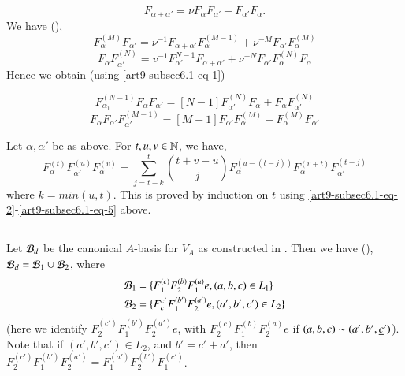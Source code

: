\setcounter{equation}{0}
\begin{equation}\label{art9-subsec6.1-eq-1}
F_{\alpha + \alpha'} = \nu F_{\alpha}F_{\alpha'}-F_{\alpha'}F_{\alpha}.
\end{equation}
We have (\cite{art9-keyL1}),
\begin{equation}\label{art9-subsec6.1-eq-2}
F_{\alpha}^{(M)}F_{\alpha'} = \nu^{-1}F_{\alpha + \alpha'}F_{\alpha}^{(M-1)}+ \nu^{-M}F_{\alpha'}F_{\alpha}^{(M)}
\end{equation}
\begin{equation}\label{art9-subsec6.1-eq-3}
F_{\alpha}F_{\alpha'}^{(N)} = v^{-1}F_{\alpha'}^{N-1}F_{\alpha+\alpha'}+ \nu^{-N}F_{\alpha'}F_{\alpha}^{(N)}F_{\alpha}
\end{equation}
Hence we obtain (using \eqref{art9-subsec6.1-eq-1})

\begin{equation}\label{art9-subsec6.1-eq-4}
F_{\alpha_{1}}^{(N-1)}F_{\alpha}F_{\alpha'} = [N-1]F_{\alpha'}^{(N)}F_{\alpha} + F_{\alpha}F_{\alpha'}^{(N)}
\end{equation}
\begin{equation}\label{art9-subsec6.1-eq-5}
F_{\alpha}F_{\alpha'}F_{\alpha'}^{(M-1)} = [M-1]F_{\alpha'}F_{\alpha}^{(M)} + F_{\alpha}^{(M)}F_{\alpha'}
\end{equation}


\setcounter{lemma}{1}
\begin{lemma}\label{art9-lemma-6.2}
Let $\alpha, \alpha'$ be as above. For $t, u, v \in \mathbb{N}$, we have,
$$
F_{\alpha}^{(t)}F_{\alpha'}^{(u)}F_{\alpha}^{(v)} = \sum\limits_{j=t-k}^{t}\binom{t+v-u}{j} F_{\alpha}^{(u-(t-j))}F_{\alpha}^{(v+t)}F_{\alpha'}^{(t-j)}
$$
where $k =min(u, t)$. This is proved by induction on $t$ using \eqref{art9-subsec6.1-eq-2}-\eqref{art9-subsec6.1-eq-5} above.
\end{lemma}

\setcounter{subsection}{2}
\subsection{}\label{art9-subsec-6.3}
Let $\mathcal{B}_{d}$ be the canonical $A$-basis for $V_{A}$ as constructed in \cite{art9-keyL2}. Then we have (\cite{art9-keyL3}),
$\mathcal{B}_{d}= \mathcal{B}_{1} \cup \mathcal{B}_{2}$, where
\begin{align*}
\mathcal{B}_{1} &= \{F_{1}^{(c)} F_{2}^{(b)}F_{1}^{(a)}e,(a,b,c) \in L_{1}\}\\
\mathcal{B}_{2} &= \{F_{c}^{c'}F_{1}^{(b')}F_{2}^{(a')}e, (a',b', c') \in L_{2}\}
\end{align*}
(here we identify $F_{2}^{(c')}F_{1}^{(b')}F_{2}^{(a')}e$, with $F_{2}^{(c)} F_{1}^{(b)}F_{2}^{(a)} e$ if $(a,b,c) \sim (a',b',\break \underline{c}')$). Note that if $(a',b',c')\in L_{2}$, and $b' =c' + a'$, then $F_{2}^{(c')}F_{1}^{(b')}F_{2}^{(a')} = F_{1}^{(a')}F_{2}^{(b')}F_{1}^{(c')}$.

